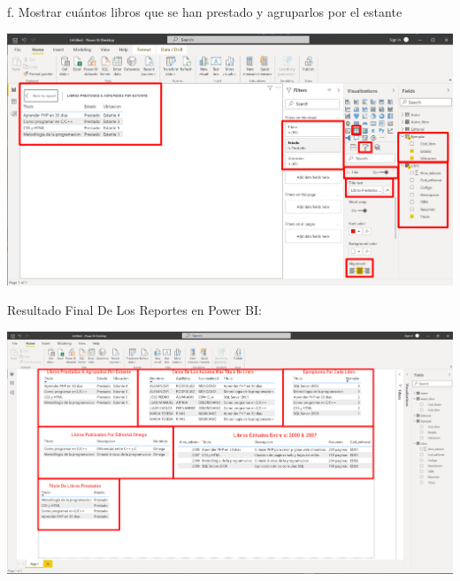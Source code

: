 \documentclass[12pt,letterpaper]{article}
\begin{document}
f. Mostrar cuántos libros que se han prestado y agruparlos por el estante
\begin{center}
    \includegraphics[width=16cm]{img/29.png} 
    \vspace{2cm} 
\end{center}
Resultado Final De Los Reportes en Power BI:
\begin{center}
    \includegraphics[width=18cm]{img/31.png}  
\end{center}
\end{document}
